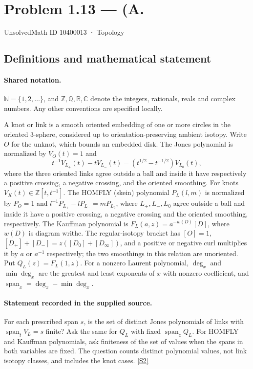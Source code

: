 \documentclass[11pt]{article}
\newcommand{\sref}[2]{\hyperlink{source:#1:#2}{[S#2]}}
\begin{document}
\setcounter{section}{10400012}
\section{Problem 1.13 — (A.}\label{10400013}
{\small\sffamily UnsolvedMath ID 10400013 · Topology}
\subsection{Definitions and mathematical statement}

\paragraph{Shared notation.}$\mathbb N=\{1,2,\ldots\}$, and $\mathbb Z,\mathbb Q,\mathbb R,\mathbb C$ denote the integers, rationals, reals and complex numbers. Any other conventions are specified locally.


A knot or link is a smooth oriented embedding of one or more circles in the oriented $3$-sphere, considered up to orientation-preserving ambient isotopy. Write $O$ for the unknot, which bounds an embedded disk. The Jones polynomial is normalized by $V_O(t)=1$ and
\[t^{-1}V_{L_+}(t)-tV_{L_-}(t)=(t^{1/2}-t^{-1/2})V_{L_0}(t),\]
where the three oriented links agree outside a ball and inside it have respectively a positive crossing, a negative crossing, and the oriented smoothing. For knots $V_K(t)\in\mathbb Z[t,t^{-1}]$. The HOMFLY (skein) polynomial $P_L(l,m)$ is normalized by $P_O=1$ and $l^{-1}P_{L_+}-lP_{L_-}=mP_{L_0}$, where $L_+,L_-,L_0$ agree outside a ball and inside it have a positive crossing, a negative crossing and the oriented smoothing, respectively. The Kauffman polynomial is $F_L(a,z)=a^{-w(D)}[D]$, where $w(D)$ is diagram writhe. The regular-isotopy bracket has $[O]=1$, $[D_+]+[D_-]=z([D_0]+[D_\infty])$, and a positive or negative curl multiplies it by $a$ or $a^{-1}$ respectively; the two smoothings in this relation are unoriented. Put $Q_L(z)=F_L(1,z)$. For a nonzero Laurent polynomial, $\deg_x$ and $\min\deg_x$ are the greatest and least exponents of $x$ with nonzero coefficient, and $\operatorname{span}_x=\deg_x-\min\deg_x$.
\paragraph{Statement recorded in the supplied source.}
For each prescribed span $s$, is the set of distinct Jones polynomials of links with $\operatorname{span}_tV_L=s$ finite? Ask the same for $Q_L$ with fixed $\operatorname{span}_zQ_L$. For HOMFLY and Kauffman polynomials, ask finiteness of the set of values when the spans in both variables are fixed. The question counts distinct polynomial values, not link isotopy classes, and includes the knot cases. \sref{10400013}{2}
\end{document}
